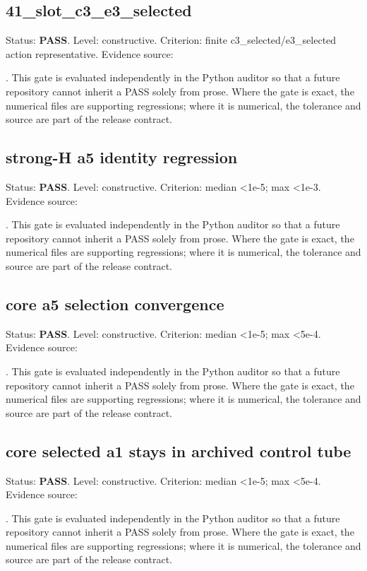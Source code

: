 \documentclass[11pt,a4paper,oneside]{book}
\begin{document}
\subsection{41\_slot\_c3\_e3\_selected}
Status: \textbf{PASS}. Level: constructive. Criterion: finite c3\_selected/e3\_selected action representative. Evidence source:\par\noindent{}. This gate is evaluated independently in the Python auditor so that a future repository cannot inherit a PASS solely from prose. Where the gate is exact, the numerical files are supporting regressions; where it is numerical, the tolerance and source are part of the release contract.\par

\subsection{strong-H a5 identity regression}
Status: \textbf{PASS}. Level: constructive. Criterion: median <1e-5; max <1e-3. Evidence source:\par\noindent{}. This gate is evaluated independently in the Python auditor so that a future repository cannot inherit a PASS solely from prose. Where the gate is exact, the numerical files are supporting regressions; where it is numerical, the tolerance and source are part of the release contract.\par

\subsection{core a5 selection convergence}
Status: \textbf{PASS}. Level: constructive. Criterion: median <1e-5; max <5e-4. Evidence source:\par\noindent{}. This gate is evaluated independently in the Python auditor so that a future repository cannot inherit a PASS solely from prose. Where the gate is exact, the numerical files are supporting regressions; where it is numerical, the tolerance and source are part of the release contract.\par

\subsection{core selected a1 stays in archived control tube}
Status: \textbf{PASS}. Level: constructive. Criterion: median <1e-5; max <5e-4. Evidence source:\par\noindent{}. This gate is evaluated independently in the Python auditor so that a future repository cannot inherit a PASS solely from prose. Where the gate is exact, the numerical files are supporting regressions; where it is numerical, the tolerance and source are part of the release contract.\par
\end{document}
